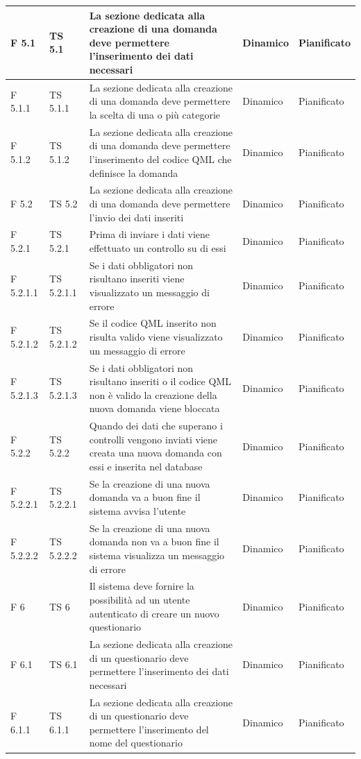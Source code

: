 \documentclass[a4paper,11pt]{article}
\begin{document}
\begin{longtable}{p{}p{}p{}p{}p{}}
\midrule
F 5.1 &TS 5.1&La sezione dedicata alla creazione di una domanda deve permettere l'inserimento dei dati necessari & Dinamico &Pianificato\\
\midrule
F 5.1.1 & TS 5.1.1 &La sezione dedicata alla creazione di una domanda deve permettere la scelta di una o più categorie & Dinamico &Pianificato\\
\midrule
F 5.1.2 & TS 5.1.2 &La sezione dedicata alla creazione di una domanda deve permettere l'inserimento del codice QML che definisce la domanda & Dinamico &Pianificato\\
\midrule
F 5.2 & TS 5.2&La sezione dedicata alla creazione di una domanda deve permettere l'invio dei dati inseriti & Dinamico &Pianificato\\
\midrule
F 5.2.1 & TS 5.2.1&Prima di inviare i dati viene effettuato un controllo su di essi & Dinamico &Pianificato\\
\midrule
F 5.2.1.1 & TS 5.2.1.1 &Se i dati obbligatori non risultano inseriti viene visualizzato un messaggio di errore & Dinamico &Pianificato\\
\midrule
F 5.2.1.2 & TS 5.2.1.2 &Se il codice QML inserito non risulta valido viene visualizzato un messaggio di errore & Dinamico &Pianificato\\
\midrule
F 5.2.1.3 &TS 5.2.1.3 &Se i dati obbligatori non risultano inseriti o il codice QML non è valido la creazione della nuova domanda viene bloccata & Dinamico &Pianificato\\
\midrule
F 5.2.2 & TS 5.2.2 &Quando dei dati che superano i controlli vengono inviati viene creata una nuova domanda con essi e inserita nel database & Dinamico &Pianificato\\
\midrule
F 5.2.2.1 & TS 5.2.2.1 &Se la creazione di una nuova domanda va a buon fine il sistema avvisa l'utente & Dinamico &Pianificato\\
\midrule
F 5.2.2.2 & TS 5.2.2.2 & Se la creazione di una nuova domanda non va a buon fine il sistema visualizza un messaggio di errore & Dinamico &Pianificato\\
\midrule
F 6 & TS 6&Il sistema deve fornire la possibilità ad un utente autenticato di creare un nuovo questionario & Dinamico &Pianificato\\
\midrule
F 6.1 &TS 6.1&La sezione dedicata alla creazione di un questionario deve permettere l'inserimento dei dati necessari & Dinamico &Pianificato\\
\midrule
F 6.1.1 & TS 6.1.1&La sezione dedicata alla creazione di un questionario deve permettere l'inserimento del nome del questionario & Dinamico &Pianificato\\

\end{longtable}
\end{document}
